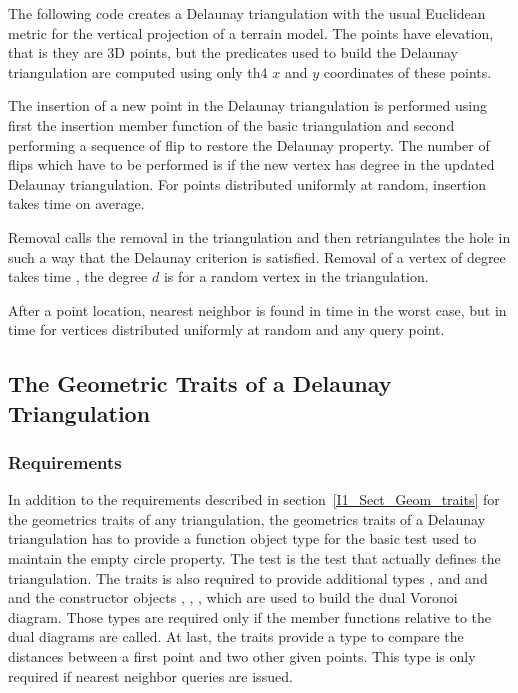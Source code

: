 \ccExample
The following code  creates a Delaunay triangulation with 
the usual Euclidean metric for the vertical projection of a 
terrain model. The points have elevation, that is they are 3D points,
but the predicates used to build the  Delaunay triangulation
are computed using only  th4 $x$ and $y$ coordinates  
of these points. 

The insertion of a new point in the Delaunay triangulation
is performed using first the insertion member function
of the basic triangulation and second 
performing a sequence of flip to restore the Delaunay property. 
The number of flips which have to be performed is 
if the new vertex has degree  in the updated
Delaunay triangulation. For
points distributed uniformly at random, insertion takes time  on
average.

Removal calls the removal in the triangulation and then retriangulates
the hole in such a way that  the Delaunay criterion is satisfied. Removal of a
vertex of degree  takes time ,
the degree $d$ is  for a random
vertex in the triangulation.

After a point location, nearest neighbor is found in time  in the
worst case, but in time 
for vertices distributed uniformly at random  and any query point. 



\subsection{The Geometric Traits of a Delaunay Triangulation}
\label{I1_Sect_Delaunay_geom_traits}

\subsubsection{Requirements}
In addition to the requirements described in section~\ref{I1_Sect_Geom_traits}
for the geometrics traits of any triangulation,
the geometrics traits of a Delaunay triangulation
has to  provide a function object type  
for the basic  test used to maintain the
empty circle property.
The  test is the test 
that actually defines the triangulation.
The traits is also required 
to provide additional types ,  and
and  and the constructor objects
, 
, ,
 which 
are used to build the dual Voronoi diagram. Those types 
are required only if the member functions relative to
the dual diagrams  are called.
At last, the traits provide a type  
to compare the distances between a first point and two other
given points. This type 
 is only required
if nearest neighbor queries are issued.




